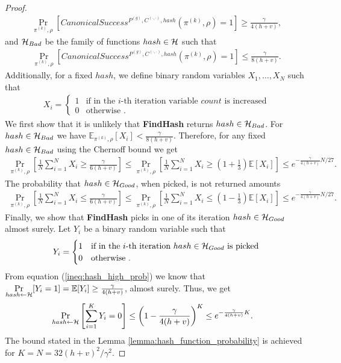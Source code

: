 \begin{proof}
\begin{align*}
\underset{\pi^{(k)}, \rho}{\Pr}\left[CanonicalSuccess^{P^{(g)}, C^{(\cdot, \cdot)}, hash}(\pi^{(k)}, \rho) = 1\right] \geq \frac{\gamma}{4(h+v)},
\end{align*}
and $\mathcal{H}_{Bad}$ be the family of functions $hash \in \mathcal{H}$ such that
\begin{align*}
\underset{\pi^{(k)}, \rho}{\Pr}\left[CanonicalSuccess^{P^{(g)}, C^{(\cdot, \cdot)}, hash}(\pi^{(k)}, \rho) = 1\right] \leq \frac{\gamma}{8(h+v)}.
\end{align*}
Additionally, for a fixed $hash$, we define binary random variables $X_1, \dots, X_N$ such that
\begin{align*}
  X_i =
  \begin{cases}
    1 & \text{if in the $i$-th iteration variable $count$ is increased}\\
    0 & \text{otherwise .}
  \end{cases}
\end{align*}
We first show that it is unlikely that \textbf{FindHash} returns $hash \in \mathcal{H}_{Bad}$.
For $hash \in \mathcal{H}_{Bad}$ we have $\mathbb{E}_{\pi^{(k)},\rho}[X_i] < \frac{\gamma}{8(h+v)}$.
Therefore, for any fixed $hash \in \mathcal{H}_{Bad}$ using the Chernoff bound we get
\begin{align*}
  \underset{\pi^{(k)},\rho}{\Pr} \left[\frac{1}{N} \sum_{i=1}^{N} X_i \geq \frac{\gamma}{6(h+v)} \right] \leq
  \underset{\pi^{(k)}, \rho}{\Pr}\left[\frac{1}{N} \sum_{i=1}^{N} X_i \geq (1 + \frac{1}{3}) \mathbb{E}[X_i]\right] \leq
  e^{-{\frac{\gamma}{4(h+v)}} N /27}.
\end{align*}
%
The probability that $hash \in \mathcal{H}_{Good}$, when picked, is not returned amounts
\begin{align*}
  \underset{\pi^{(k)}, \rho}{\Pr}\left[\frac{1}{N} \sum_{i=1}^{N} X_i \leq \frac{\gamma}{6(h+v)}\right] \leq
  \underset{\pi^{(k)}, \rho}{\Pr}\left[\frac{1}{N} \sum_{i=1}^{N} X_i \leq (1 - \frac{1}{3})\mathbb{E}[X_i]\right] \leq e^{-{\frac{\gamma}{4(h+v)}} N /27}.
\end{align*}
%
Finally, we show that \textbf{FindHash} picks in one of its iteration $hash \in \mathcal{H}_{Good}$ almost surely.
Let $Y_i$ be a binary random variable such that
\begin{align*}
  Y_i =
  \begin{cases}
    1 & \text{if in the $i$-th iteration $hash \in \mathcal{H}_{Good}$ is picked} \\
    0 & \text{otherwise .}
  \end{cases}
\end{align*}
From equation (\ref{ineq:hash_high_prob}) we know that $\underset{hash \leftarrow \mathcal{H}}{\Pr}[Y_i = 1] = \mathbb{E}[Y_i] \geq \frac{\gamma}{4(h+v)}$, almost surely.
Thus, we get
\begin{align*}
  \underset{hash \leftarrow \mathcal{H}}{\Pr}\left[\sum_{i=1}^{K} Y_i = 0\right] &\leq \left(1 - \frac{\gamma}{4(h+v)}\right)^{K} \leq e^{-\frac{\gamma}{4(h+v)} K}.
\end{align*}
The bound stated in the Lemma \ref{lemma:hash_function_probability} is achieved for $K = N = 32(h+v)^2/\gamma^2$.
\end{proof}
